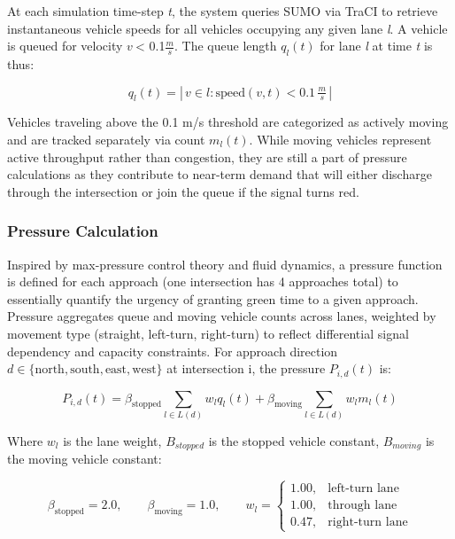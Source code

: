 \documentclass[12pt]{article}
\begin{document}
At each simulation time-step \emph{t}, the system queries SUMO via TraCI to retrieve instantaneous vehicle speeds for all vehicles occupying any given lane \emph{l}. A vehicle is queued for velocity \(v\ \)\textless{} 0.1\(\frac{m}{s}\). The queue length \(q_{l}(t)\) for lane \emph{l} at time \emph{t} is thus:

\begin{equation}
\label{eq:queue_length}
    q_l(t) = \left|\, v \in l : \text{speed}(v,t) < 0.1\,\tfrac{m}{s} \,\right|
\end{equation}



Vehicles traveling above the 0.1 m/s threshold are categorized as actively moving and are tracked separately via count \(m_{l}(t)\). While moving vehicles represent active throughput rather than congestion, they are still a part of pressure calculations as they contribute to near-term demand that will either discharge through the intersection or join the queue if the signal turns red.

\subsubsection{Pressure Calculation}

Inspired by max-pressure control theory \cite{varaiya2013} and fluid dynamics, a pressure function is defined for each approach (one intersection has 4 approaches total) to essentially quantify the urgency of granting green time to a given approach. Pressure aggregates queue and moving vehicle counts across lanes, weighted by movement type (straight, left-turn, right-turn) to reflect differential signal dependency and capacity constraints. For approach direction $d \in \{\text{north}, \text{south}, \text{east}, \text{west}\}$ at intersection i, the pressure $P_{i,d}(t)$ is:

\begin{equation}
\label{eq:pressure}
    P_{i,d}(t) = \beta_{\text{stopped}} \sum_{l\in L(d)} w_l q_l(t) + \beta_{\text{moving}} \sum_{l\in L(d)} w_l m_l(t)
\end{equation}



Where \(w_{l}\) is the lane weight, \(B_{stopped}\) is the stopped vehicle constant, \(B_{moving}\) is the moving vehicle constant:

\[
\beta_{\text{stopped}} = 2.0, \qquad \beta_{\text{moving}} = 1.0, \qquad w_l = \begin{cases} 1.00, & \text{left-turn lane} \\ 1.00, & \text{through lane} \\ 0.47, & \text{right-turn lane} \end{cases}
\]
\end{document}
